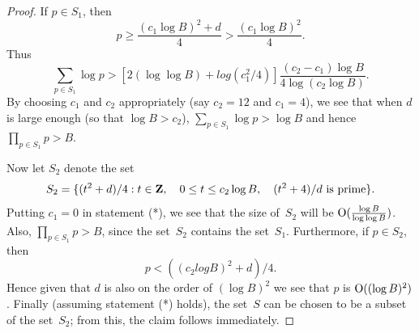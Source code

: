 \documentclass{amsart}
\newcommand{\Z}{{\bf{Z}}}
\newcommand{\bigo}{{\rm O}}
\newcommand{\comment}[1]{}
\theoremstyle{plain}
\begin{document}
{\begin{proof}
If $p \in S_1$, then 
$$p \geq \frac{(c_1 \log B)^2 + d}{4} > \frac{ (c_1 \log B)^2}{4}.$$
Thus $$\sum_{p \in S_1} \log p > [2 (\log \log B) + log (c_1^2/4)]
\frac{(c_2 - c_1) \log B}{4 \log(c_2 \log B)}.$$
By choosing $c_1$ and $c_2$ appropriately (say $c_2=12$ and $c_1=4$), we see
that when $d$ is large enough (so that $\log B > c_2$),
$\sum_{p\in S_1} \log p > \log B$
and hence $\prod_{p\in S_1} p > B$.

Now let $S_2$ denote the set
$$S_2 = \{(t^2+d)/4 : t \in \Z, \quad 0 \leq t \leq c_2 \log B, \quad
(t^2+4)/d \mbox{{\rm\ is prime}} \}.$$
Putting $c_1=0$ in statement (*), we see that the size of~$S_2$ 
will be $\bigo(\frac{\log B}{\log \log B})$. Also,
$\prod_{p\in S_1} p > B$, since the set~$S_2$
contains the set~$S_1$. Furthermore, if $p \in S_2$, then 
$$p < ((c_2 log B)^2 + d)/4.$$ 
Hence  given that $d$ is also on the order of $(\log B)^2$
we see that $p$ is $\bigo((\log B)^2)$.
Finally (assuming statement (*) holds), the set~$S$ can be chosen to be a subset of
the set~$S_2$; from this, the claim follows immediately.
\end{proof}
}
\comment{
However, estimates for the size and number of the primes
used in Step~(1) are conjectural.
A special case of the Bateman-Horn conjecture 
would imply that the size of the largest prime
(of the special form $4p_i = t^2+d$) 
required so that the product exceeds $B$ is roughly $(\log B)^2$,
and there is a corresponding estimate for the number of primes required.
For the purpose of comparing the two versions of the Chinese Remainder 
algorithm, we will use the model of the distribution of all primes,
so that the largest prime can be expected to be roughly $\log B$ and the
number of primes is estimated to be roughly $\log B/\log\log B$.  
Neither one of these frameworks fits our actual data from small examples 
very well (see Examples 7.1 and 7.2 of the Appendix).
}


\end{document}
